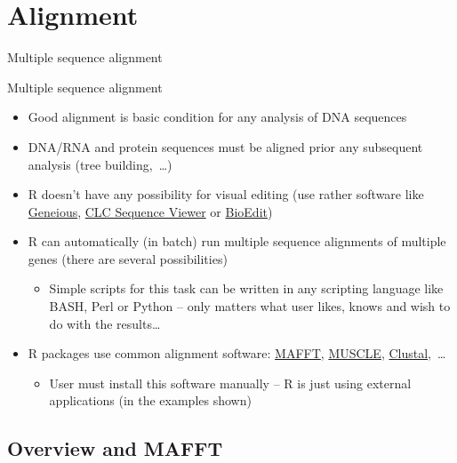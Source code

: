 \documentclass[compress, ucs, xelatex, 11pt, xcolor=svgnames,
  hyperref={
    bookmarks=true,
    unicode=true,
    colorlinks=true,
    pdftitle={Molecular data in R},
    plainpages=false,
    pdfauthor={Vojtech Zeisek},
    pdfsubject={Course about phylogeny and evolution in R},
    pdfcreator={XeLaTeX},
    pdfkeywords={R, evolution, phylogeny, molecular data},
    linkcolor=Tomato,
    anchorcolor=SaddleBrown,
    citecolor=Goldenrod,
    filecolor=DarkMagenta,
    menucolor=Sienna,
    urlcolor=DarkTurquoise,
    pdftex},
  url={hyphens, lowtilde} %
  ]{beamer}
\begin{document}
\section{Alignment}

\begin{frame}{Multiple sequence alignment}
  \tableofcontents[currentsection, sectionstyle=show/hide, hideothersubsections]
\end{frame}

\begin{frame}{Multiple sequence alignment}
  \label{alignment}
  \begin{itemize}
    \item Good alignment is basic condition for any analysis of DNA sequences
    \item DNA/RNA and protein sequences must be aligned prior any subsequent analysis (tree building,~\ldots)
    \item R doesn't have any possibility for visual editing (use rather software like \href{https://www.geneious.com/}{Geneious}, \href{https://www.qiagenbioinformatics.com/products/clc-sequence-viewer/}{CLC Sequence Viewer} or \href{http://www.mbio.ncsu.edu/bioedit/bioedit.html}{BioEdit})
    \item R can automatically (in batch) run multiple sequence alignments of multiple genes (there are several possibilities)
    \begin{itemize}
      \item Simple scripts for this task can be written in any scripting language like BASH, Perl or Python -- only matters what user likes, knows and wish to do with the results\ldots
    \end{itemize}
    \item R packages use common alignment software: \href{https://mafft.cbrc.jp/alignment/software/}{MAFFT}, \href{https://www.drive5.com/muscle/}{MUSCLE}, \href{http://clustal.org/}{Clustal},~\ldots
    \begin{itemize}
      \item User must install this software manually -- R is just using external applications (in the examples shown)
    \end{itemize}
  \end{itemize}
\end{frame}

\subsection{Overview and MAFFT}
\end{document}
